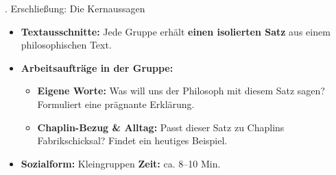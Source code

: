 \documentclass{beamer}
\begin{document}
\begin{frame}[t]{\faQuoteLeft {}. Erschließung: Die Kernaussagen}
\vspace{0.2cm}

\begin{itemize}
    \item[] \textbf{\faStream \enskip Textausschnitte:} \newline
    \normalsize Jede Gruppe erhält \textbf{einen isolierten Satz} aus einem philosophischen Text.
\end{itemize}

\vspace{0.3cm}

\begin{itemize}
    \item[] \textbf{\faPen \enskip Arbeitsaufträge in der Gruppe:}
    \vspace{0.15cm}
    \begin{itemize}\normalsize
        \item[\textbf{1.}] \textbf{Eigene Worte:} Was will uns der Philosoph mit diesem Satz sagen? Formuliert eine prägnante Erklärung.
        \vspace{0.15cm}
        \item[\textbf{2.}] \textbf{Chaplin-Bezug \& Alltag:} Passt dieser Satz zu Chaplins Fabrikschicksal? Findet ein heutiges Beispiel.
    \end{itemize}
\end{itemize}

\vspace{0.5cm}
\begin{itemize}
    \item[] \textbf{\faUsers \enskip Sozialform:} Kleingruppen \quad \textbf{\faClock \enskip Zeit:} ca. 8--10 Min.
\end{itemize}

\end{frame}
\end{document}

